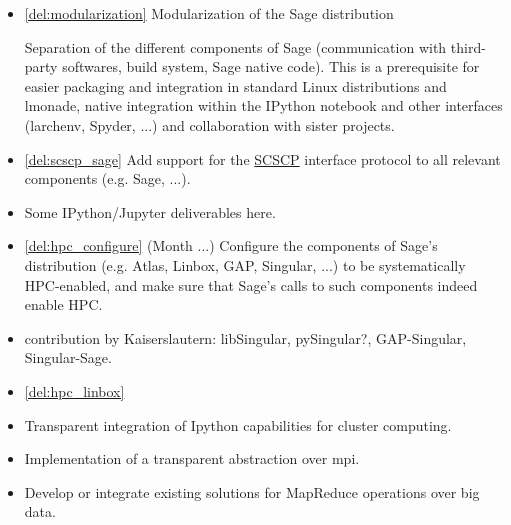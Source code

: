 \begin{Workpackage}{\thewpno}
\begin{WPDeliverables}
\begin{itemize}
\item \ref{del:modularization} Modularization of the Sage distribution

  Separation of the different components of Sage (communication with
  third-party softwares, build system, Sage native code). This is a
  prerequisite for easier packaging and integration in standard Linux
  distributions and lmonade, native integration within the IPython
  notebook and other interfaces (larchenv, Spyder, ...) and
  collaboration with sister projects.


\item \ref{del:scscp_sage} Add support for the
  \href{http://www.symbolic-computing.org/}{SCSCP} interface protocol
  to all relevant components (e.g. Sage, ...).

\item Some IPython/Jupyter deliverables here.

\item \ref{del:hpc_configure} (Month ...) Configure the components of
  Sage's distribution (e.g. Atlas, Linbox, GAP, Singular, ...) to be
  systematically HPC-enabled, and make sure that Sage's calls to such
  components indeed enable HPC.

\item contribution by Kaiserslautern: libSingular, pySingular?,
  GAP-Singular, Singular-Sage.

\item \ref{del:hpc_linbox} 

\item Transparent integration of Ipython capabilities for cluster computing.
\item Implementation of a transparent abstraction over mpi.
\item Develop or integrate existing solutions for MapReduce operations
  over big data.



\end{itemize}
\end{WPDeliverables}
\end{Workpackage}
